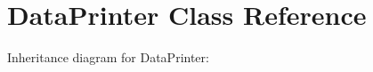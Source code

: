 \hypertarget{classDataPrinter}{}\section{Data\+Printer Class Reference}
\label{classDataPrinter}


Inheritance diagram for Data\+Printer\+:
